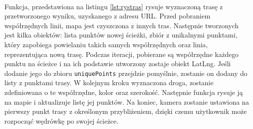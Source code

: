 \noindent
\begin{minipage}{\linewidth}
    \label{lst:trasa}
    \centering
\end{minipage}
\\

Funkcja, przedstawiona na listingu \ref{lst:rystras} rysuje wyznaczoną trasę z przetworzonego wyniku, uzyskanego z adresu URL. Przed pobraniem współrzędnych linii, mapa jest czyszczona z innych tras. Następnie tworzonych jest kilka obiektów: lista punktów nowej ścieżki, zbiór z unikalnymi punktami, który zapobiega powielaniu takich samych współrzędnych oraz linia, reprezentująca nową trasę. Podczas iteracji, pobierane są współrzędne każdego punktu na ścieżce i na ich podstawie utworzony zostaje obiekt LatLng. Jeśli dodanie jego do zbioru \verb|uniquePoints| przejdzie pomyślnie, zostanie on dodany do listy z punktami trasy. W kolejnym kroku wyznaczona droga, zostanie zdefiniowana o te współrzędne, kolor oraz szerokość. Następnie funkcja rysuje ją na mapie i aktualizuje listę jej punktów. Na koniec, kamera zostanie ustawiona na pierwszy punkt trasy z określonym przybliżeniem, dzięki czemu użytkownik może rozpocząć wędrówkę po swojej ścieżce.\\

